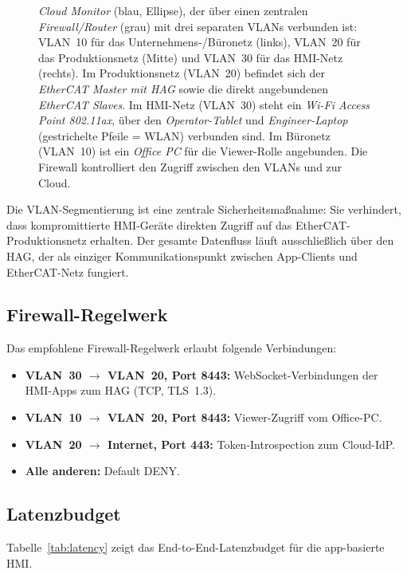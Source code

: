 ﻿\documentclass[12pt,a4paper]{article}
\begin{document}
\begin{figure}[h]
{  \emph{Cloud Monitor} (blau, Ellipse), der über einen zentralen \emph{Firewall/Router}
  (grau) mit drei separaten VLANs verbunden ist: VLAN~10 für das
  Unternehmens-/Büronetz (links), VLAN~20 für das Produktionsnetz (Mitte) und
  VLAN~30 für das HMI-Netz (rechts). Im Produktionsnetz (VLAN~20) befindet sich der
  \emph{EtherCAT Master mit HAG} sowie die direkt angebundenen
  \emph{EtherCAT Slaves}. Im HMI-Netz (VLAN~30) steht ein \emph{Wi-Fi Access Point
  802.11ax}, über den \emph{Operator-Tablet} und \emph{Engineer-Laptop}
  (gestrichelte Pfeile = WLAN) verbunden sind. Im Büronetz (VLAN~10) ist ein
  \emph{Office PC} für die Viewer-Rolle angebunden. Die Firewall kontrolliert den
  Zugriff zwischen den VLANs und zur Cloud.}
\label{fig:network_diagram}
\end{figure}

Die VLAN-Segmentierung ist eine zentrale Sicherheitsma\ss{}nahme: Sie verhindert, dass
kompromittierte HMI-Geräte direkten Zugriff auf das EtherCAT-Produktionsnetz erhalten.
Der gesamte Datenfluss läuft ausschlie\ss{}lich über den HAG, der als einziger
Kommunikationspunkt zwischen App-Clients und EtherCAT-Netz fungiert.

\subsection{Firewall-Regelwerk}

Das empfohlene Firewall-Regelwerk erlaubt folgende Verbindungen:

\begin{itemize}[leftmargin=2em]
  \item \textbf{VLAN~30 $\to$ VLAN~20, Port 8443:} WebSocket-Verbindungen der HMI-Apps
    zum HAG (TCP, TLS~1.3).
  \item \textbf{VLAN~10 $\to$ VLAN~20, Port 8443:} Viewer-Zugriff vom Office-PC.
  \item \textbf{VLAN~20 $\to$ Internet, Port 443:} Token-Introspection zum Cloud-IdP.
  \item \textbf{Alle anderen:} Default DENY.
\end{itemize}

\subsection{Latenzbudget}

Tabelle~\ref{tab:latency} zeigt das End-to-End-Latenzbudget für die app-basierte HMI.
\end{document}
